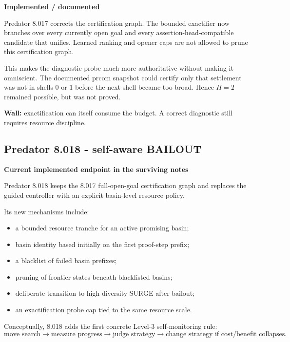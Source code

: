 \documentclass[11pt]{article}
\newcommand{\implemented}{\textbf{Implemented / documented}}
\begin{document}
\begin{statusbox}\implemented\end{statusbox}

Predator 8.017 corrects the certification graph. The bounded exactifier now branches over every currently open goal and every assertion-head-compatible candidate that unifies. Learned ranking and opener caps are not allowed to prune this certification graph.

This makes the diagnostic probe much more authoritative without making it omniscient. The documented prcom snapshot could certify only that settlement was not in shells 0 or 1 before the next shell became too broad. Hence $H=2$ remained possible, but was not proved.

\textbf{Wall:} exactification can itself consume the budget. A correct diagnostic still requires resource discipline.

\subsection{Predator 8.018 - self-aware BAILOUT}

\begin{statusbox}\textbf{Current implemented endpoint in the surviving notes}\end{statusbox}

Predator 8.018 keeps the 8.017 full-open-goal certification graph and replaces the guided controller with an explicit basin-level resource policy.

Its new mechanisms include:
\begin{itemize}
\item a bounded resource tranche for an active promising basin;
\item basin identity based initially on the first proof-step prefix;
\item a blacklist of failed basin prefixes;
\item pruning of frontier states beneath blacklisted basins;
\item deliberate transition to high-diversity SURGE after bailout;
\item an exactification probe cap tied to the same resource scale.
\end{itemize}

Conceptually, 8.018 adds the first concrete Level-3 self-monitoring rule:
\[
\boxed{\text{move search}}
\to
\boxed{\text{measure progress}}
\to
\boxed{\text{judge strategy}}
\to
\boxed{\text{change strategy if cost/benefit collapses}}.
\]
\end{document}
